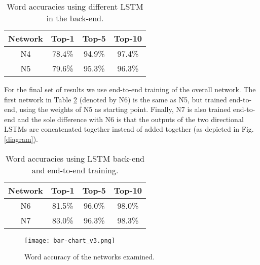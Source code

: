 \documentclass[a4paper]{article}
\begin{document}
\begin{table}[!htbp]
\centering
\begin{tabular}{| c || c | c | c|} 
\hline
Network & Top-1 & Top-5 & Top-10 \\ [0.5ex] 
\hline
N4 & 78.4\% & 94.9\% & 97.4\% \\ 
\hline
N5 & 79.6\% & 95.3\% & 96.3\% \\ 
\hline
\end{tabular}
\caption{Word accuracies using different LSTM in the back-end.}\label{LSTM}
\end{table}

For the final set of results we use end-to-end training of the overall network. The first network in Table \ref{E2E} (denoted by N6) is the same as N5, but trained end-to-end, using the weights of N5 as starting point. Finally, N7 is also trained end-to-end and the sole difference with N6 is that the outputs of the two directional LSTMs are concatenated together instead of added together (as depicted in Fig. \ref{diagram}). 

\begin{table}[!htbp]
\centering
\begin{tabular}{| c || c | c | c |} 
\hline
Network & Top-1 & Top-5 & Top-10 \\ [0.5ex] 
\hline
N6 & 81.5\% & 96.0\% & 98.0\% \\ 
\hline
N7 & 83.0\% & 96.3\% & 98.3\% \\ 
\hline
\end{tabular}
\vspace{1mm}\caption{Word accuracies using LSTM back-end and end-to-end training.}\label{E2E}
\end{table}

\begin{figure}
\centering
\texttt{[image: bar-chart\_v3.png]}
\vspace{-5mm}\caption{Word accuracy of the networks examined.}
\label{chart}
\end{figure}
\end{document}
